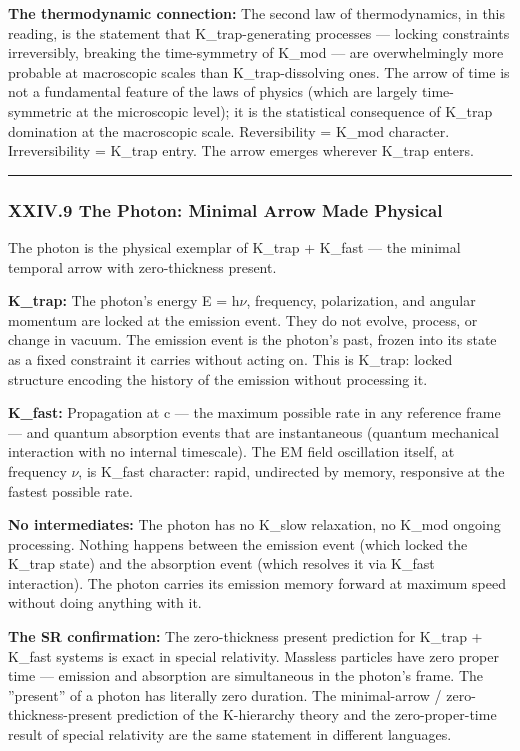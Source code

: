 \documentclass[12pt,a4paper]{article}
\begin{document}
\textbf{The thermodynamic connection:} The second law of thermodynamics, in this reading, is the statement that K\_trap-generating processes --- locking constraints irreversibly, breaking the time-symmetry of K\_mod --- are overwhelmingly more probable at macroscopic scales than K\_trap-dissolving ones. The arrow of time is not a fundamental feature of the laws of physics (which are largely time-symmetric at the microscopic level); it is the statistical consequence of K\_trap domination at the macroscopic scale. Reversibility = K\_mod character. Irreversibility = K\_trap entry. The arrow emerges wherever K\_trap enters.

\begin{center}
\rule{0.5\textwidth}{0.4pt}
\end{center}

\subsubsection{XXIV.9 The Photon: Minimal Arrow Made Physical}

The photon is the physical exemplar of K\_trap + K\_fast --- the minimal temporal arrow with zero-thickness present.

\textbf{K\_trap:} The photon's energy E = h$\nu$, frequency, polarization, and angular momentum are locked at the emission event. They do not evolve, process, or change in vacuum. The emission event is the photon's past, frozen into its state as a fixed constraint it carries without acting on. This is K\_trap: locked structure encoding the history of the emission without processing it.

\textbf{K\_fast:} Propagation at c --- the maximum possible rate in any reference frame --- and quantum absorption events that are instantaneous (quantum mechanical interaction with no internal timescale). The EM field oscillation itself, at frequency $\nu$, is K\_fast character: rapid, undirected by memory, responsive at the fastest possible rate.

\textbf{No intermediates:} The photon has no K\_slow relaxation, no K\_mod ongoing processing. Nothing happens between the emission event (which locked the K\_trap state) and the absorption event (which resolves it via K\_fast interaction). The photon carries its emission memory forward at maximum speed without doing anything with it.

\textbf{The SR confirmation:} The zero-thickness present prediction for K\_trap + K\_fast systems is exact in special relativity. Massless particles have zero proper time --- emission and absorption are simultaneous in the photon's frame. The ''present'' of a photon has literally zero duration. The minimal-arrow / zero-thickness-present prediction of the K-hierarchy theory and the zero-proper-time result of special relativity are the same statement in different languages.
\end{document}
